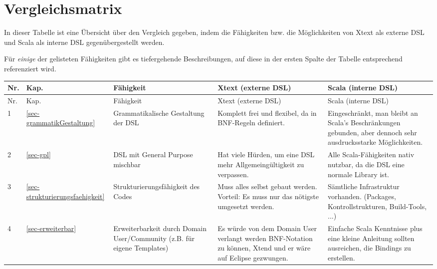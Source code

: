 \section{Vergleichsmatrix}\label{sec-vergleichsmatrix}

In dieser Tabelle ist eine Übersicht über den Vergleich gegeben, indem
die Fähigkeiten bzw. die Möglichkeiten von Xtext als externe DSL und
Scala als interne DSL gegenübergestellt werden.

Für \emph{einige} der gelisteten Fähigkeiten gibt es
tiefergehende Beschreibungen, auf diese
in der ersten Spalte der Tabelle entsprechend referenziert wird.

\begin{landscape}
\begin{longtable}{|p{0.5cm}|p{0.8cm}|p{4.3cm}|p{6.3cm}|p{6.3cm}|}

  \hline
  Nr. & Kap. & Fähigkeit & Xtext (externe DSL) & Scala (interne DSL) \\ \hline \hline
  \endfirsthead

  \hline
  Nr. & Kap. & Fähigkeit & Xtext (externe DSL) & Scala (interne DSL) \\ \hline
  \endhead

  1
  & \ref{sec-grammatikGestaltung}
  & Grammatikalische Gestaltung der DSL
  & Komplett frei und flexibel, da in BNF-Regeln definiert.
  & Eingeschränkt, man bleibt an Scala's Beschränkungen gebunden, aber
    dennoch sehr ausdrucksstarke Möglichkeiten.
  \\\hline

  2
  & \ref{sec-gpl}
  & DSL mit General Purpose mischbar
  & Hat viele Hürden, um eine DSL mehr Allgemeingültigkeit zu verpassen.
  & Alle Scala-Fähigkeiten nativ nutzbar, da die DSL eine normale Library ist.
  \\\hline

  3
  & \ref{sec-strukturierungsfaehigkeit}
  & Strukturierungsfähigkeit des Codes
  & Muss alles selbst gebaut werden. Vorteil: Es muss nur das nötigste
    umgesetzt werden.
  & Sämtliche Infrastruktur vorhanden. (Packages, Kontrollstrukturen,
    Build-Tools, ...)
  \\\hline

  4
  & \ref{sec-erweiterbar}
  & Erweiterbarkeit durch Domain User/Community (z.B. für eigene Templates)
  & Es würde von dem Domain User verlangt werden BNF-Notation zu können,
    Xtend und er wäre auf Eclipse gezwungen. %
  & Einfache Scala Kenntnisse plus eine kleine Anleitung sollten ausreichen,
    die Bindings zu erstellen.
  \\\hline


\end{longtable}
\end{landscape}
